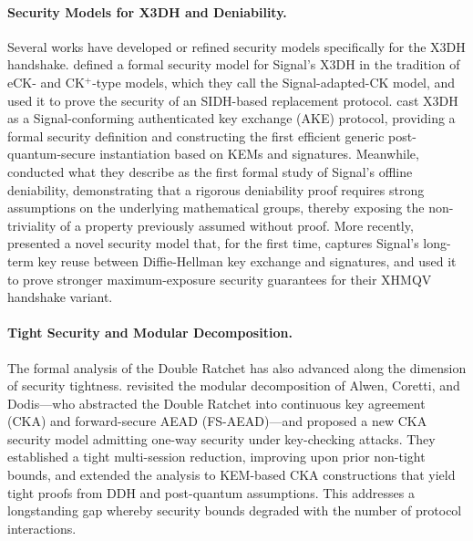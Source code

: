 \paragraph{Security Models for X3DH and Deniability.}
Several works have developed or refined security models specifically for the X3DH handshake. \textcite{dobson2022} defined a formal security model for Signal's X3DH in the tradition of eCK- and CK$^+$-type models, which they call the Signal-adapted-CK model, and used it to prove the security of an SIDH-based replacement protocol. \textcite{hashimoto2021} cast X3DH as a Signal-conforming authenticated key exchange (AKE) protocol, providing a formal security definition and constructing the first efficient generic post-quantum-secure instantiation based on KEMs and signatures. Meanwhile, \textcite{vatandas2020} conducted what they describe as the first formal study of Signal's offline deniability, demonstrating that a rigorous deniability proof requires strong assumptions on the underlying mathematical groups, thereby exposing the non-triviality of a property previously assumed without proof. More recently, \textcite{fiedler2025} presented a novel security model that, for the first time, captures Signal's long-term key reuse between Diffie-Hellman key exchange and signatures, and used it to prove stronger maximum-exposure security guarantees for their XHMQV handshake variant.

\paragraph{Tight Security and Modular Decomposition.}
The formal analysis of the Double Ratchet has also advanced along the dimension of security tightness. \textcite{collins2024} revisited the modular decomposition of Alwen, Coretti, and Dodis—who abstracted the Double Ratchet into continuous key agreement (CKA) and forward-secure AEAD (FS-AEAD)—and proposed a new CKA security model admitting one-way security under key-checking attacks. They established a tight multi-session reduction, improving upon prior non-tight bounds, and extended the analysis to KEM-based CKA constructions that yield tight proofs from DDH and post-quantum assumptions. This addresses a longstanding gap whereby security bounds degraded with the number of protocol interactions.

